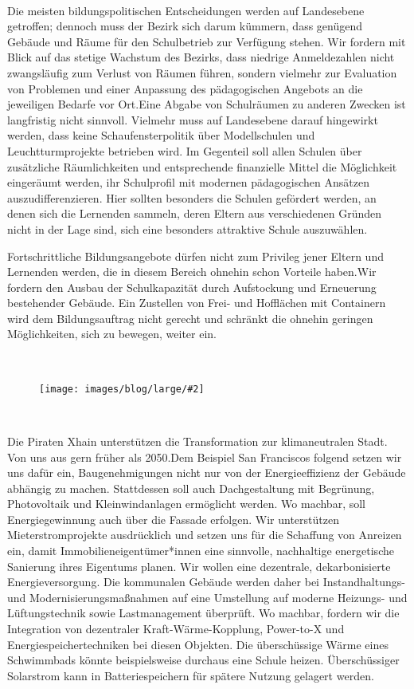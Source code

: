 \documentclass[a4paper,10pt]{article}
\newcommand{\mysection}[1]{{\vspace{1cm}\noindent\color{gray}{\ttfamily\LARGE\raggedright #1}\\\medskip}}
\newcommand{\abschnitt}[2]{%
\mysection{\raggedright #1}%
\begin{figure}[t]%
\vspace*{-2.7cm}%
\hspace*{-2.1cm}%
\texttt{[image: images/blog/large/\#2]} %
\end{figure}%
}
\newcommand{\bottomfigure}[1]{
\parbox{5cm}{
\vspace*{1cm}%
\texttt{[image: ./images/blog/large/\#1]}
}
}
\begin{document}


\mysection{Schule}

Die meisten bildungspolitischen Entscheidungen werden auf Landesebene
getroffen; dennoch muss der Bezirk sich darum kümmern, dass genügend
Gebäude und Räume für den Schulbetrieb zur Verfügung stehen. Wir fordern
mit Blick auf das stetige Wachstum des Bezirks, dass niedrige
Anmeldezahlen nicht zwangsläufig zum Verlust von Räumen führen, sondern
vielmehr zur Evaluation von Problemen und einer Anpassung des
pädagogischen Angebots an die jeweiligen Bedarfe vor Ort.Eine Abgabe von
Schulräumen zu anderen Zwecken ist langfristig nicht sinnvoll. Vielmehr
muss auf Landesebene darauf hingewirkt werden, dass keine
Schaufensterpolitik über Modellschulen und Leuchtturmprojekte betrieben
wird. Im Gegenteil soll allen Schulen über zusätzliche Räumlichkeiten
und entsprechende finanzielle Mittel die Möglichkeit eingeräumt werden,
ihr Schulprofil mit modernen pädagogischen Ansätzen auszudifferenzieren.
Hier sollten besonders die Schulen gefördert werden, an denen sich die
Lernenden sammeln, deren Eltern aus verschiedenen Gründen nicht in der
Lage sind, sich eine besonders attraktive Schule auszuwählen.

Fortschrittliche Bildungsangebote dürfen nicht zum Privileg jener Eltern
und Lernenden werden, die in diesem Bereich ohnehin schon Vorteile
haben.Wir fordern den Ausbau der Schulkapazität durch Aufstockung und
Erneuerung bestehender Gebäude. Ein Zustellen von Frei- und Hofflächen
mit Containern wird dem Bildungsauftrag nicht gerecht und schränkt die
ohnehin geringen Möglichkeiten, sich zu bewegen, weiter ein.

\abschnitt{}{establishment.jpg}
\mysection{Energiewende}
\vspace*{-1.5cm}

Die Piraten Xhain unterstützen die Transformation zur klimaneutralen
Stadt. Von uns aus gern früher als 2050.Dem Beispiel San Franciscos
folgend setzen wir uns dafür ein, Baugenehmigungen nicht nur von der
Energieeffizienz der Gebäude abhängig zu machen. Stattdessen soll auch
Dachgestaltung mit Begrünung, Photovoltaik und Kleinwindanlagen
ermöglicht werden. Wo machbar, soll Energiegewinnung auch über die
Fassade erfolgen. Wir unterstützen Mieterstromprojekte ausdrücklich und
setzen uns für die Schaffung von Anreizen ein, damit
Immobilieneigentümer*innen eine sinnvolle, nachhaltige energetische
Sanierung ihres Eigentums planen. Wir wollen eine dezentrale,
dekarbonisierte Energieversorgung. Die kommunalen Gebäude werden daher
bei Instandhaltungs- und Modernisierungsmaßnahmen auf eine Umstellung
auf moderne Heizungs- und Lüftungstechnik sowie Lastmanagement
überprüft. Wo machbar, fordern wir die Integration von dezentraler
Kraft-Wärme-Kopplung, Power-to-X und Energiespeichertechniken bei diesen
Objekten. Die überschüssige Wärme eines Schwimmbads könnte
beispielsweise durchaus eine Schule heizen. Überschüssiger Solarstrom
kann in Batteriespeichern für spätere Nutzung gelagert werden.
\end{document}
